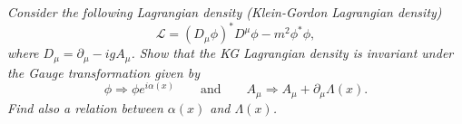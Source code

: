 \begin{example}
	\emph{Consider the following Lagrangian density (Klein-Gordon Lagrangian density)}
	\begin{equation}
		\mathcal{L}=(D_\mu\phi)^*D^\mu\phi-m^2\phi^*\phi,
		\label{KG}
	\end{equation} 
	\emph{where $D_\mu=\partial_\mu-igA_\mu$. Show that the KG Lagrangian density is invariant under the Gauge transformation given by}
	\begin{equation}
		\phi\Rightarrow \phi e^{i\alpha(x)} \qquad \mbox{and} \qquad A_\mu\Rightarrow A_\mu+\partial_\mu\Lambda(x).
	\end{equation} 
	\emph{Find also a relation between $\alpha(x)$ and $\Lambda(x)$.}\newline
	

\end{example}
